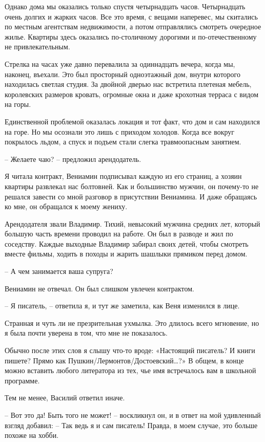 \documentclass[
]{book}
\begin{document}
Однако дома мы оказались только спустя четырнадцать часов. Четырнадцать очень долгих и жарких часов. Все это время, с вещами наперевес, мы скитались по местным агентствам недвижимости, а потом отправлялись смотреть очередное жилье. Квартиры здесь оказались по-столичному дорогими и по-отечественному не привлекательным.

Стрелка на часах уже давно перевалила за одиннадцать вечера, когда мы, наконец, въехали. Это был просторный одноэтажный дом, внутри которого находилась светлая студия. За двойной дверью нас встретила плетеная мебель, королевских размеров кровать, огромные окна и даже крохотная терраса с видом на горы.

Единственной проблемой оказалась локация и тот факт, что дом и сам находился на горе. Но мы осознали это лишь с приходом холодов. Когда все вокруг покрылось льдом, а спуск и подъем стали слегка травмоопасным занятием.

-- Желаете чаю? -- предложил арендодатель.

Я читала контракт, Вениамин подписывал каждую из его страниц, а хозяин квартиры развлекал нас болтовней. Как и большинство мужчин, он почему-то не решался завести со мной разговор в присутствии Вениамина. И даже обращаясь ко мне, он обращался к моему жениху.

Арендодателя звали Владимир. Тихий, невысокий мужчина средних лет, который большую часть времени проводил на работе. Он был в разводе и жил по соседству. Каждые выходные Владимир забирал своих детей, чтобы смотреть вместе фильмы, ходить в походы и жарить шашлыки прямиком перед домом.

-- А чем занимается ваша супруга?

Вениамин не отвечал. Он был слишком увлечен контрактом.

-- Я писатель, -- ответила я, и тут же заметила, как Веня изменился в лице.

Странная и чуть ли не презрительная ухмылка. Это длилось всего мгновение, но я была почти уверена в том, что мне не показалось.

Обычно после этих слов я слышу что-то вроде: «Настоящий писатель? И книги пишете? Прямо как Пушкин/Лермонтов/Достоевский\ldots?» В общем, в конце можно вставить любого литератора из тех, чье имя встречалось вам в школьной программе.

Тем не менее, Василий ответил иначе.

-- Вот это да! Быть того не может! -- воскликнул он, и в ответ на мой удивленный взгляд добавил: -- Так ведь я и сам писатель! Правда, в моем случае, это больше похоже на хобби.
\end{document}

